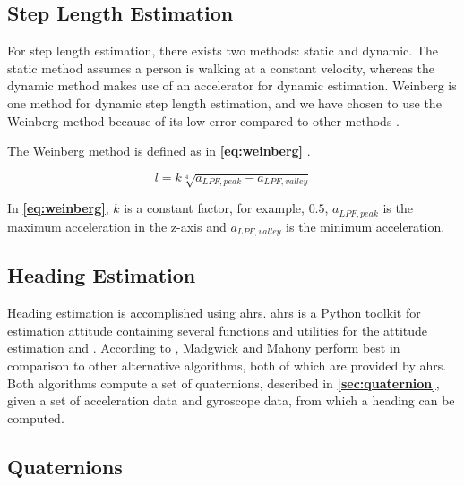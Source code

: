 \subsection{Step Length Estimation}

For step length estimation, there exists two methods: static and dynamic. The static method assumes a person is walking at a constant velocity, whereas the dynamic method makes use of an accelerator for dynamic estimation. Weinberg is one method for dynamic step length estimation, and we have chosen to use the Weinberg method because of its low error compared to other methods \cite{HybridPositioningPaper}.

The Weinberg method is defined as in \textbf{\autoref{eq:weinberg}} \cite{weinberg}.

\begin{equation} \label{eq:weinberg}
    l = k \sqrt[4]{a_{LPF, peak} - a_{LPF, valley}}
\end{equation}

In \textbf{\autoref{eq:weinberg}}, $k$ is a constant factor, for example, $0.5$, $a_{LPF, peak}$ is the maximum acceleration in the z-axis and $a_{LPF, valley}$ is the minimum acceleration. 

\subsection{Heading Estimation}
Heading estimation is accomplished using \gls{ahrs}. \gls{ahrs} is a Python toolkit for estimation attitude containing several functions and utilities for the attitude estimation\cite{ahrs} and \cite{FastAHRS}. According to \cite{MultisensorComparison}, Madgwick and Mahony perform best in comparison to other alternative algorithms, both of which are provided by \gls{ahrs}. Both algorithms compute a set of quaternions, described in \textbf{\autoref{sec:quaternion}}, given a set of acceleration data and gyroscope data, from which a heading can be computed.

\subsection{Quaternions} \label{sec:quaternion}